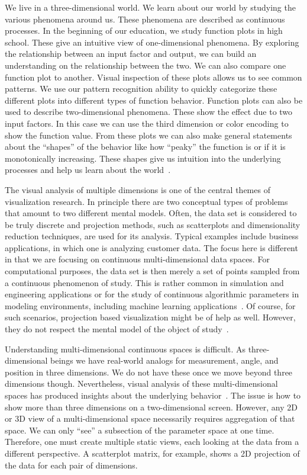 
We live in a three-dimensional world.  
We learn about our world by studying the various
phenomena around us.  These phenomena are described as continuous processes.
In the beginning of our  education, we study function plots in high school.
These give an intuitive view of one-dimensional phenomena.  
By exploring the
relationship between an input factor
and output,
we can build an understanding on the relationship between the two.  We can also
compare one function plot to another. Visual inspection of these plots allows
us to see common patterns. We use our pattern recognition ability to quickly
categorize these different plots into different types of function behavior.
Function plots can also be used to describe two-dimensional phenomena. These
show the effect due to two input factors. In this case we can use the third
dimension or color encoding to show the function value.  From these plots we
can also make general statements about the ``shapes'' of the behavior like how
``peaky'' the function is or if it is monotonically increasing. These shapes
give us intuition into the underlying processes and help us learn about the
world~\cite{Palmer:1999}.

The visual analysis of multiple dimensions is one of the central themes of
visualization research. In principle there are two conceptual types of problems
that amount to two different mental models. Often, the data set is
considered to be truly discrete and projection methods, such as scatterplots
and dimensionality reduction techniques, are used for its analysis.  Typical
examples include business applications, in which one is analyzing customer
data.  The focus here is different in that we are focusing on
continuous multi-dimensional data spaces. For computational purposes, the data
set is then merely a set of points sampled from a continuous phenomenon of
study. This is rather common in simulation and engineering applications or for
the study of continuous algorithmic parameters in modeling environments,
including machine learning applications~\cite{Sedlmair:2014}. Of course, for
such scenarios, projection based visualization might be of help as well.
However, they do not respect the mental model of the object of
study~\cite{Tory:2004}.

Understanding multi-dimensional continuous spaces is difficult. As
three-dimensional beings we have real-world analogs for measurement, angle, and
position in three dimensions. We do not have these once we move beyond three
dimensions though. Nevertheless, visual analysis of these multi-dimensional
spaces has produced insights about the underlying
behavior~\cite{Sedlmair:2014,Gleicher:2016}. The issue is how to show more than
three dimensions on a two-dimensional screen. 
However, any 2D or 3D view of a multi-dimensional space necessarily requires
aggregation of that space.
We can only ``see'' a subsection of the parameter
space at one time.
Therefore, one must create multiple static views, each looking at 
the data from a different perspective.  A scatterplot matrix, for example,
shows a 2D projection of the data for each pair of dimensions.

